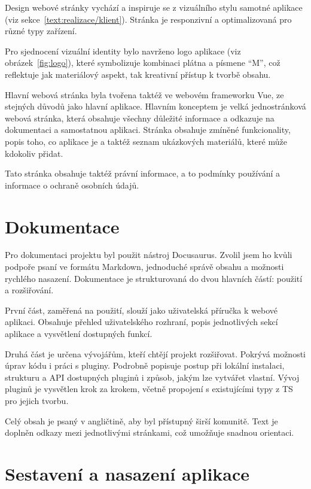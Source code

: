 Design webové stránky vychází a inspiruje se z vizuálního stylu samotné aplikace (viz sekce~\ref{text:realizace/klient}). 
Stránka je responzivní a optimalizovaná pro různé typy zařízení.

Pro sjednocení vizuální identity bylo navrženo logo aplikace (viz obrázek~\ref{fig:logo}), které symbolizuje kombinaci plátna a písmene \enquote{M}, což reflektuje jak materiálový aspekt, tak kreativní přístup k tvorbě obsahu.

Hlavní webová stránka byla tvořena taktéž ve webovém frameworku Vue, ze stejných důvodů jako hlavní aplikace.
Hlavním konceptem je velká jednostránková webová stránka, která obsahuje všechny důležité informace a odkazuje na dokumentaci a samostatnou aplikaci.
Stránka obsahuje zmíněné funkcionality, popis toho, co aplikace je a taktéž seznam ukázkových materiálů, které může kdokoliv přidat.

Tato stránka obsahuje taktéž právní informace, a to podmínky používání a informace o ochraně osobních údajů.


\section{Dokumentace}

Pro dokumentaci projektu byl použit nástroj Docusaurus. 
Zvolil jsem ho kvůli podpoře psaní ve formátu Markdown, jednoduché správě obsahu a možnosti rychlého nasazení. 
Dokumentace je strukturovaná do dvou hlavních částí: použití a rozšiřování.

První část, zaměřená na použití, slouží jako uživatelská příručka k webové aplikaci. 
Obsahuje přehled uživatelského rozhraní, popis jednotlivých sekcí aplikace a vysvětlení dostupných funkcí. 

Druhá část je určena vývojářům, kteří chtějí projekt rozšiřovat. 
Pokrývá možnosti úprav kódu i práci s pluginy. 
Podrobně popisuje postup při lokální instalaci, strukturu a API dostupných pluginů i způsob, jakým lze vytvářet vlastní. 
Vývoj pluginů je vysvětlen krok za krokem, včetně propojení s existujícími typy z TS pro jejich tvorbu.

Celý obsah je psaný v angličtině, aby byl přístupný širší komunitě. 
Text je doplněn odkazy mezi jednotlivými stránkami, což umožňuje snadnou orientaci.

\section{Sestavení a nasazení aplikace}\label{text:realizace/nasazeni}

